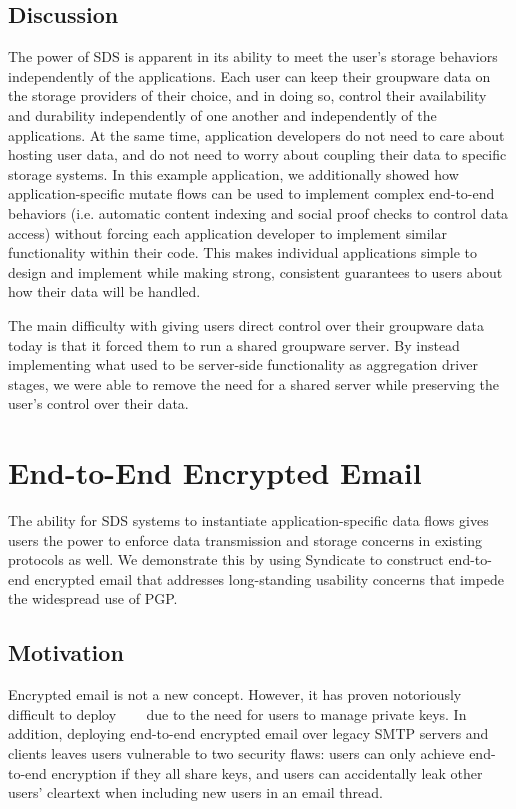 \subsection{Discussion}

The power of SDS is apparent in its ability to meet the user's storage behaviors
independently of the applications.  Each user can keep their groupware data on
the storage providers of their choice, and in doing so, control their
availability and durability independently of one another and independently of
the applications.  At the same time, application developers do not need to care
about hosting user data, and do not need to worry about coupling their data to
specific storage systems.  In this example application, we additionally showed
how application-specific mutate flows can be used to implement complex
end-to-end behaviors (i.e. automatic content indexing and social proof checks to
control data access) without forcing each
application developer to implement similar functionality within their
code.  This makes individual applications simple to design and implement
while making strong, consistent guarantees to users about how their data will be
handled.

The main difficulty with giving users direct control over their groupware data
today is that it forced them to run a shared groupware server.  By instead
implementing what used to be server-side functionality as aggregation driver
stages, we were able to remove the need for a shared server while preserving the
user's control over their data.

\section{End-to-End Encrypted Email}

The ability for SDS systems to instantiate application-specific data flows gives
users the power to enforce data transmission and storage concerns in existing
protocols as well.  We demonstrate this by using Syndicate to construct
end-to-end encrypted email that addresses long-standing
usability concerns that impede the widespread use of PGP.

\subsection{Motivation}

Encrypted email is not a new concept.  However, it has proven notoriously difficult to
deploy~\cite{why-jonny-cant-encrypt}~\cite{why-jonny-still-cant-encrypt}
~\cite{why-jonny-still-still-cant-encrypt} due to the need for users to manage
private keys.  In addition, deploying end-to-end encrypted email over legacy
SMTP servers and clients leaves users vulnerable to two security flaws:  users
can only achieve end-to-end encryption if they all share keys, and users can
accidentally leak other users' cleartext when including new users in an email
thread.

